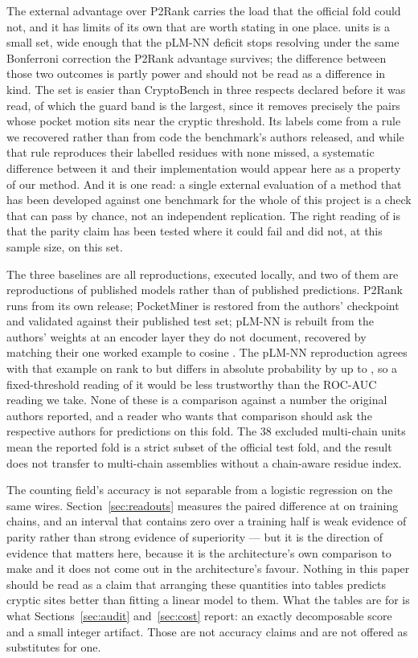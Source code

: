 \documentclass[11pt]{article}
\begin{document}
The external advantage over P2Rank carries the load that the official fold could
not, and it has limits of its own that are worth stating in one place.
\ExtN{} units is a small set, wide enough that the pLM-NN deficit stops resolving
under the same Bonferroni correction the P2Rank advantage survives; the difference
between those two outcomes is partly power and should not be read as a difference
in kind. The set is easier than CryptoBench in three respects declared before it
was read, of which the guard band is the largest, since it removes precisely the
pairs whose pocket motion sits near the cryptic threshold. Its labels come from a
rule we recovered rather than from code the benchmark's authors released, and
while that rule reproduces their labelled residues with none missed, a systematic
difference between it and their implementation would appear here as a property of
our method. And it is one read: a single external evaluation of a method that has
been developed against one benchmark for the whole of this project is a check that
can pass by chance, not an independent replication. The right reading of
\ExtAucPtwoR{} is that the parity claim has been tested where it could fail and
did not, at this sample size, on this set.

The three baselines are all reproductions, executed locally, and two of them are
reproductions of published models rather than of published predictions. P2Rank
runs from its own release; PocketMiner is restored from the authors' checkpoint and
validated against their published test set; pLM-NN is rebuilt from the authors'
weights at an encoder layer they do not document, recovered by matching their one
worked example to cosine \PlmFidelity{}. The pLM-NN reproduction agrees with that
example on rank to \PlmRank{} but differs in absolute probability by up to
\PlmMaxDp{}, so a fixed-threshold reading of it would be less trustworthy than the
ROC-AUC reading we take. None of these is a comparison against a number the
original authors reported, and a reader who wants that comparison should ask the
respective authors for predictions on this fold. The 38
excluded multi-chain units mean the reported fold is a strict subset of the
official test fold, and the result does not transfer to multi-chain assemblies
without a chain-aware residue index.

The counting field's accuracy is not separable from a logistic regression on the
same wires. Section~\ref{sec:readouts} measures the paired difference at
\RdLogitDelta{} \RdLogitCI{} on \RdNPaired{} training chains, and an interval
that contains zero over a training half is weak evidence of parity rather than
strong evidence of superiority --- but it is the direction of evidence that
matters here, because it is the architecture's own comparison to make and it
does not come out in the architecture's favour. Nothing in this paper should be
read as a claim that arranging these quantities into tables predicts cryptic
sites better than fitting a linear model to them. What the tables are for is
what Sections~\ref{sec:audit} and~\ref{sec:cost} report: an exactly decomposable
score and a small integer artifact. Those are not accuracy claims and are not
offered as substitutes for one.
\end{document}
